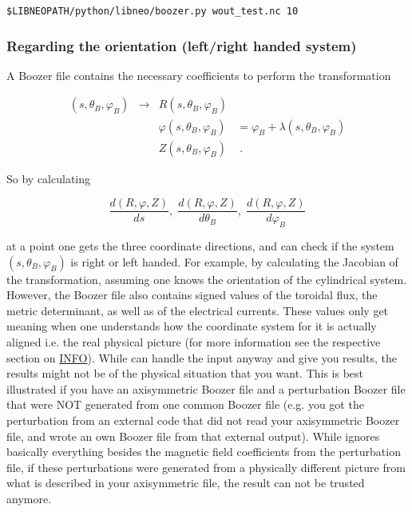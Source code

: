 \documentclass{article}
\newcommand{\vv}[1]{\texttt{\detokenize{#1}}}
\begin{document}
\begin{verbatim}
$LIBNEOPATH/python/libneo/boozer.py wout_test.nc 10
\end{verbatim}

\subsubsection{Regarding the orientation (left/right handed system)}
A Boozer file contains the necessary coefficients to perform the transformation 

\begin{align*}
    (s,\theta_B,\varphi_B) &\to& R(s,\theta_B,\varphi_B) &  \\
                         &   & \varphi(s,\theta_B,\varphi_B) &= \varphi_B + \lambda(s,\theta_B,\varphi_B) \\
                         &   & Z(s,\theta_B,\varphi_B) & \; .
\end{align*}

So by calculating

\begin{equation*}
	\frac{d(R,\varphi,Z)}{ds},\; \frac{d(R,\varphi,Z)}{d\theta_B},\; \frac{d(R,\varphi,Z)}{d\varphi_B}
\end{equation*}

at a point one gets the three coordinate directions, and can check if the 
system $(s,\theta_B,\varphi_B)$ is right or left handed. For example, by calculating
the Jacobian of the transformation, assuming one knows the orientation of the cylindrical system. 
However, the Boozer file also contains signed values of the toroidal flux, 
the metric determinant, as well as of the electrical currents. These values 
only get meaning when one understands how the coordinate system for it is 
actually aligned i.e. the real physical picture (for more information see the 
respective section on \href{https://gitlab.tugraz.at/plasma/info/-/blob/GeorgGrassler/TOPIC_MHD_Equilibria/Conventions.md}{INFO}). 
While \vv{NEO-2} can handle the input anyway and give you 
results, the results might not be of the physical situation that you want. 
This is best illustrated if you have an axisymmetric Boozer file and a 
perturbation Boozer file that were NOT generated from one common Boozer 
file (e.g. you got the perturbation from an external code that did not 
read your axisymmetric Boozer file, and wrote an own Boozer file from 
that external output). While \vv{NEO-2} ignores basically everything besides 
the magnetic field coefficients from the perturbation file, if these 
perturbations were generated from a physically different picture from
what is described in your axisymmetric file, the result can not be trusted anymore.
\end{document}
